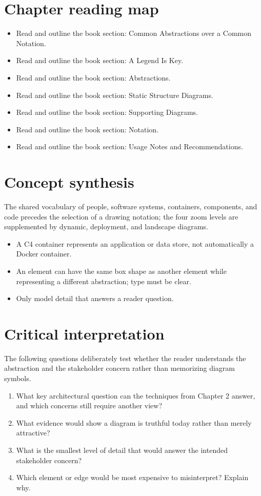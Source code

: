 \documentclass[10pt,letterpaper]{article}
\begin{document}
\section{Chapter reading map}
\begin{itemize}
\item Read and outline the book section: Common Abstractions over a Common Notation.
\item Read and outline the book section: A Legend Is Key.
\item Read and outline the book section: Abstractions.
\item Read and outline the book section: Static Structure Diagrams.
\item Read and outline the book section: Supporting Diagrams.
\item Read and outline the book section: Notation.
\item Read and outline the book section: Usage Notes and Recommendations.
\end{itemize}

\section{Concept synthesis}
The shared vocabulary of people, software systems, containers, components, and code precedes the selection of a drawing notation; the four zoom levels are supplemented by dynamic, deployment, and landscape diagrams.

\begin{itemize}
\item A C4 container represents an application or data store, not automatically a Docker container.
\item An element can have the same box shape as another element while representing a different abstraction; type must be clear.
\item Only model detail that answers a reader question.
\end{itemize}

\section{Critical interpretation}
The following questions deliberately test whether the reader understands the abstraction and the stakeholder concern rather than memorizing diagram symbols.

\begin{enumerate}
\item What key architectural question can the techniques from Chapter 2 answer, and which concerns still require another view?
\item What evidence would show a diagram is truthful today rather than merely attractive?
\item What is the smallest level of detail that would answer the intended stakeholder concern?
\item Which element or edge would be most expensive to misinterpret? Explain why.
\end{enumerate}
\end{document}
